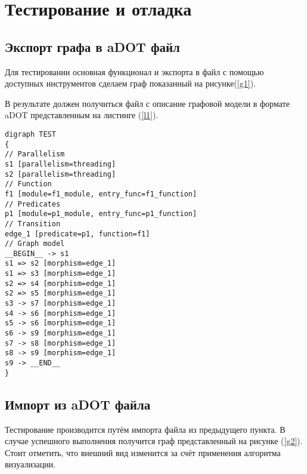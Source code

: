 \chapter{Тестирование и отладка}\label{chap4_soft_testing}
\section{Экспорт графа в aDOT файл}
Для тестировании основная функционал и экспорта в файл с помощью доступных инструментов сделаем граф показанный на рисунке(\ref{g1}).

В результате должен получиться файл с описание графовой модели в формате aDOT представленным на листинге (\ref{l1}).
\begin{lstlisting}[label=l1, caption={\textit{Полученное описание графовой модели в формате aDOT}}]
digraph TEST
{
// Parallelism
s1 [parallelism=threading]
s2 [parallelism=threading]
// Function
f1 [module=f1_module, entry_func=f1_function]
// Predicates
p1 [module=p1_module, entry_func=p1_function]
// Transition
edge_1 [predicate=p1, function=f1]
// Graph model
__BEGIN__ -> s1
s1 => s2 [morphism=edge_1]
s1 => s3 [morphism=edge_1]
s2 => s4 [morphism=edge_1]
s2 => s5 [morphism=edge_1]
s3 -> s7 [morphism=edge_1]
s4 -> s6 [morphism=edge_1]
s5 -> s6 [morphism=edge_1]
s6 -> s9 [morphism=edge_1]
s7 -> s8 [morphism=edge_1]
s8 -> s9 [morphism=edge_1]
s9 -> __END__
}
\end{lstlisting}

\section{Импорт из aDOT файла}
Тестирование производится путём импорта файла из предыдущего пункта. В случае успешного выполнения получится граф представленный на рисунке (\ref{g2}). Стоит отметить, что внешний вид изменится за счёт применения алгоритма визуализации.

